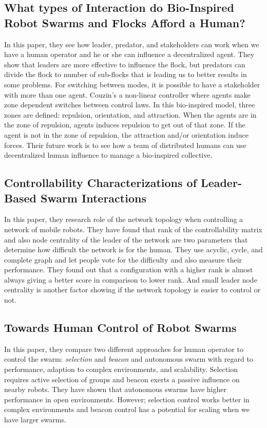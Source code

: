 \documentclass[letterpaper, 10 pt, conference]{ieeeconf}
\begin{document}
\subsection{What types of Interaction do Bio-Inspired Robot Swarms and Flocks Afford a Human?}

In this paper, they see how leader, predator, and stakeholders can work when we have a human operator and he or she can influence a decentralized agent. They show that leaders are more effective to influence the flock, but predators can divide the flock to number of sub-flocks that is leading us to better results in some problems. For switching between modes, it is possible to have a stakeholder with more than one agent. Couzin's a non-linear controller where agents make zone dependent switches between control laws. In this bio-inspired model, three zones are defined: repulsion, orientation, and attraction. When the agents are in the zone of repulsion, agents induces repulsion to get out of that zone. If the agent is not in the zone of repulsion, the attraction and/or orientation induce forces. Their future work is to see how a team of distributed humans can use decentralized human influence to manage a bio-inspired collective.\cite{Goodrich2012}

\subsection{Controllability Characterizations of Leader-Based Swarm Interactions}

In this paper, they research role of the network topology when controlling a network of mobile robots. They have found that rank of the controllability matrix and also node centrality of the leader of the network are two parameters that determine how difficult the network is for the human. They use acyclic, cycle, and complete graph and let people vote for the difficulty and also measure their performance. They found out that a configuration with a higher rank is almost always giving a better score in comparison to lower rank. And small leader node centrality is another factor showing if the network topology is easier to control or not. \cite{Croix2012}

\subsection{Towards Human Control of Robot Swarms}

In this paper, they compare two different approaches for human operator to control the swarm: \emph{selection} and \emph{beacon} and autonomous swarm with regard to performance, adaption to complex environments, and scalability. Selection requires active selection of groups and beacon exerts a passive influence on nearby robots. They have shown that autonomous swarms have higher performance in open environments. However; selection control works better in complex environments and beacon control has a potential for scaling when we have larger swarms. \cite{Lewis2012}
 


\end{document}

